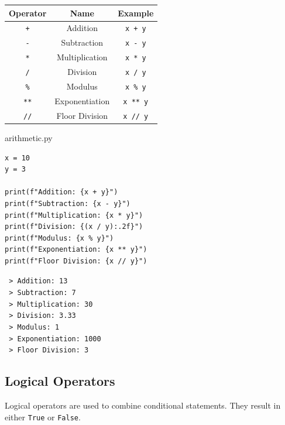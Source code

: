 \documentclass{report}
\begin{document}
\begin{table}[H]
\centering
\begin{tabular}{|c|c|c|}
\hline
\textbf{Operator} & \textbf{Name} & \textbf{Example} \\ \hline
\texttt{+} & Addition & \texttt{x + y} \\ \hline
\texttt{-} & Subtraction & \texttt{x - y} \\ \hline
\texttt{*} & Multiplication & \texttt{x * y} \\ \hline
\texttt{/} & Division & \texttt{x / y} \\ \hline
\texttt{\%} & Modulus & \texttt{x \% y} \\ \hline
\texttt{**} & Exponentiation & \texttt{x ** y} \\ \hline
\texttt{//} & Floor Division & \texttt{x // y} \\ \hline
\end{tabular}
\end{table}

\begin{vscode}{arithmetic.py}
\begin{lstlisting}[style=vscodeStyle]
x = 10
y = 3

print(f"Addition: {x + y}")
print(f"Subtraction: {x - y}")
print(f"Multiplication: {x * y}")
print(f"Division: {(x / y):.2f}")
print(f"Modulus: {x % y}")
print(f"Exponentiation: {x ** y}")
print(f"Floor Division: {x // y}") 
\end{lstlisting}
\end{vscode}

\begin{terminal}
\texttt{\color{terminalFont} > Addition: 13}\\
\texttt{\color{terminalFont} > Subtraction: 7}\\
\texttt{\color{terminalFont} > Multiplication: 30}\\
\texttt{\color{terminalFont} > Division: 3.33}\\
\texttt{\color{terminalFont} > Modulus: 1}\\
\texttt{\color{terminalFont} > Exponentiation: 1000}\\
\texttt{\color{terminalFont} > Floor Division: 3}\\
\end{terminal}

\subsection{Logical Operators}
Logical operators are used to combine conditional statements. They result in either \texttt{True} or \texttt{False}.
\\\\ 
\end{document}
